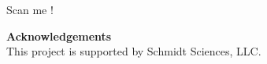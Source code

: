 \citet{Atkinson2025}
\begin{flushright}
\end{flushright}
\begin{flushright}
 Scan me ! 
\end{flushright}


 \printbibliography
 
\textbf{Acknowledgements}\\
This project is supported by Schmidt Sciences, LLC.
\vspace{0.5cm}
